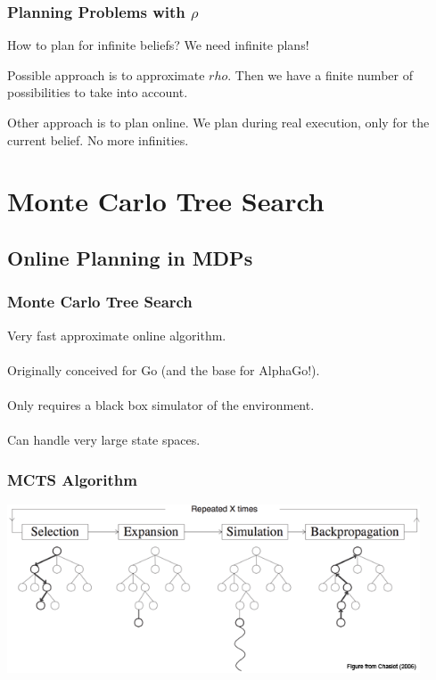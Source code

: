 \documentclass[xcolor={dvipsnames}]{beamer}
\begin{document}
\begin{frame}
\frametitle{Planning Problems with $\rho$}
\begin{block}{}
How to plan for infinite beliefs? We need infinite plans!
\end{block}
\begin{block}{}
Possible approach is to approximate $rho$. Then we have a finite number of possibilities to take
into account.
\end{block}
\begin{block}{}
Other approach is to plan online. We plan during real execution, only for the current belief. No
more infinities.
\end{block}
\end{frame}


\section[MCTS]{Monte Carlo Tree Search}
\subsection{Online Planning in MDPs}
\begin{frame}
\frametitle{Monte Carlo Tree Search}
\begin{block}{}
Very fast approximate online algorithm. \\~\\
Originally conceived for Go (and the base for AlphaGo!). \\~\\
Only requires a black box simulator of the environment. \\~\\
Can handle very large state spaces.
\end{block}
\end{frame}

\begin{frame}
\frametitle{MCTS Algorithm}
\centerline{\includegraphics[height=5cm]{images/mcts.png}}
\end{frame}
\end{document}
